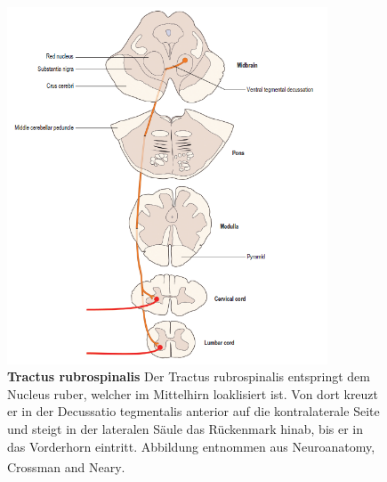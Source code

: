 \documentclass[12pt,a4paper,pdftex]{article}
\begin{document}
\begin{figure}[H]
    \centering
    \includegraphics[width=0.85\textwidth]{pictures/Bilder_Laura/rubrospinal_tract.PNG}
    \caption[Tractus rubrospinalis]{\textbf{Tractus rubrospinalis} Der Tractus rubrospinalis entspringt dem Nucleus ruber, welcher im Mittelhirn loaklisiert ist. Von dort kreuzt er in der Decussatio tegmentalis anterior auf die kontralaterale Seite und steigt in der lateralen Säule das Rückenmark hinab, bis er in das Vorderhorn eintritt. Abbildung entnommen aus Neuroanatomy, Crossman and Neary\textsuperscript{\cite[8]{crossman2014neuroanatomy}}.}
    \label{fig:tr_rubrospinalis}
\end{figure}
\end{document}
